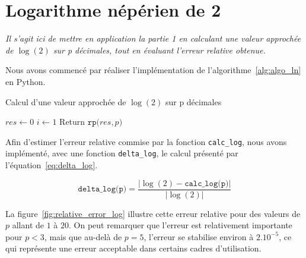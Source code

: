 \documentclass{article}
\begin{document}



\section{Logarithme népérien de 2}
\label{sec:ln}
\textit{Il s'agit ici de mettre en application la partie 1 en calculant une valeur approchée de $\log(2)$ sur p d\'ecimales, tout en \'evaluant l'erreur relative obtenue.}
\vskip 1mm ~

Nous avons commencé par réaliser l'implémentation de l'algorithme~\ref{alg:algo_ln} en Python.

\begin{algorithm}
  \caption{Calcul d'une valeur approchée de $\log(2)$ sur p d\'ecimales}
  \label{alg:algo_ln}
  $res \gets 0$\;
  $i \gets 1$\;
  Return $\texttt{rp(}res,p\texttt{)}$\;
\end{algorithm}




Afin d'estimer l'erreur relative commise par la fonction \verb|calc_log|, nous avons implémenté, avec une fonction \verb|delta_log|, le calcul présenté par l'équation~\ref{eq:delta_log}.

\begin{equation}
  \texttt{delta\_log(p)} = \dfrac{\big\vert \log(2) - \texttt{calc\_log(p)} \big\vert}{\big\vert \log(2) \big\vert}
  \label{eq:delta_log}
 \end{equation} 

La figure~\ref{fig:relative_error_log} illustre cette erreur relative pour des valeurs de $p$ allant de $1$ à $20$. On peut remarquer que l'erreur est relativement importante pour $p<3$, mais que au-delà de $p=5$, l'erreur se stabilise environ à $2.10^{-5}$, ce qui représente une erreur acceptable dans certains cadres d'utilisation.
\end{document}
